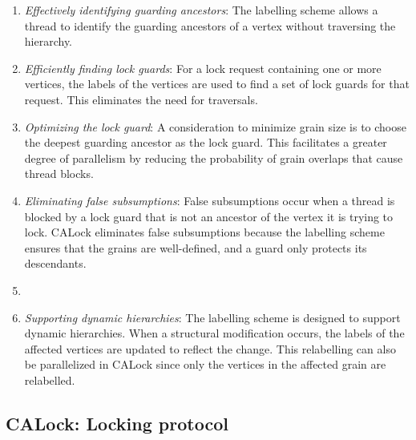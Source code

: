 \begin{enumerate}
    \item \emph{Effectively identifying guarding ancestors}: The labelling scheme allows a thread to identify the guarding ancestors of a vertex without traversing the hierarchy.
    \item \emph{Efficiently finding lock guards}: For a lock request containing one or more vertices, the labels of the vertices are used to find a set of lock guards for that request. This eliminates the need for traversals. 
    \item \emph{Optimizing the lock guard}: A consideration to minimize grain size is to choose the deepest guarding ancestor as the lock guard. This facilitates a greater degree of parallelism by reducing the probability of grain overlaps that cause thread blocks.
    \item \emph{Eliminating false subsumptions}: False subsumptions occur when a thread is blocked by a lock guard that is not an ancestor of the vertex it is trying to lock. CALock eliminates false subsumptions because the labelling scheme ensures that the grains are well-defined, and a guard only protects its descendants.
    \item     \item \emph{Supporting dynamic hierarchies}: The labelling scheme is designed to support dynamic hierarchies. When a structural modification occurs, the labels of the affected vertices are updated to reflect the change. This relabelling can also be parallelized in CALock since only the vertices in the affected grain are relabelled. 
\end{enumerate}


\subsection{CALock: Locking protocol}

